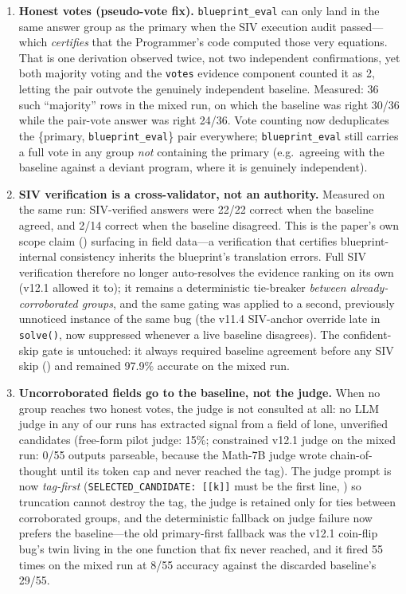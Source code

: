 \documentclass[11pt,a4paper]{article}
\begin{document}
\begin{enumerate}[leftmargin=*,itemsep=2pt]
    \item \textbf{Honest votes (pseudo-vote fix).} \texttt{blueprint\_eval} can only land in the same answer group as the primary when the SIV execution audit passed---which \emph{certifies} that the Programmer's code computed those very equations. That is one derivation observed twice, not two independent confirmations, yet both majority voting and the \texttt{votes} evidence component counted it as 2, letting the pair outvote the genuinely independent baseline. Measured: 36 such ``majority'' rows in the mixed run, on which the baseline was right 30/36 while the pair-vote answer was right 24/36. Vote counting now deduplicates the \{primary, \texttt{blueprint\_eval}\} pair everywhere; \texttt{blueprint\_eval} still carries a full vote in any group \emph{not} containing the primary (e.g.\ agreeing with the baseline against a deviant program, where it is genuinely independent).
    \item \textbf{SIV verification is a cross-validator, not an authority.} Measured on the same run: SIV-verified answers were 22/22 correct when the baseline agreed, and 2/14 correct when the baseline disagreed. This is the paper's own scope claim () surfacing in field data---a verification that certifies blueprint-internal consistency inherits the blueprint's translation errors. Full SIV verification therefore no longer auto-resolves the evidence ranking on its own (v12.1 allowed it to); it remains a deterministic tie-breaker \emph{between already-corroborated groups}, and the same gating was applied to a second, previously unnoticed instance of the same bug (the v11.4 SIV-anchor override late in \texttt{solve()}, now suppressed whenever a live baseline disagrees). The confident-skip gate is untouched: it always required baseline agreement before any SIV skip () and remained 97.9\% accurate on the mixed run.
    \item \textbf{Uncorroborated fields go to the baseline, not the judge.} When no group reaches two honest votes, the judge is not consulted at all: no LLM judge in any of our runs has extracted signal from a field of lone, unverified candidates (free-form pilot judge: 15\%; constrained v12.1 judge on the mixed run: 0/55 outputs parseable, because the Math-7B judge wrote chain-of-thought until its token cap and never reached the tag). The judge prompt is now \emph{tag-first} (\texttt{SELECTED\_CANDIDATE:~[[k]]} must be the first line, ) so truncation cannot destroy the tag, the judge is retained only for ties between corroborated groups, and the deterministic fallback on judge failure now prefers the baseline---the old primary-first fallback was the v12.1 coin-flip bug's twin living in the one function that fix never reached, and it fired 55 times on the mixed run at 8/55 accuracy against the discarded baseline's 29/55.
\end{enumerate}
\end{document}
